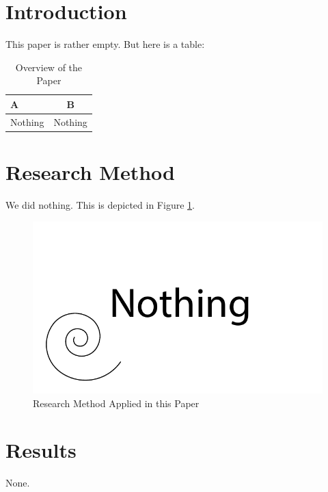
\section{Introduction}
This paper is rather empty.
But here is a table:
\begin{table}[!ht]
\caption{Overview of the Paper}
\label{tb:paperB_overview}
\centering
\begin{tabular}{|p{.35\linewidth}|c|}
\hline
A&B\\
\hline
\hline
Nothing & Nothing\\
\hline
\end{tabular}
\end{table}

\section{Research Method}
We did nothing.
This is depicted in Figure \ref{fig:paperB_method}.

\begin{figure}[!htb]
  \centering
  \includegraphics[width=\textwidth]{figures/paperB/method.pdf}
  \caption{Research Method Applied in this Paper}
  \label{fig:paperB_method}
\end{figure}

\section{Results}
None.